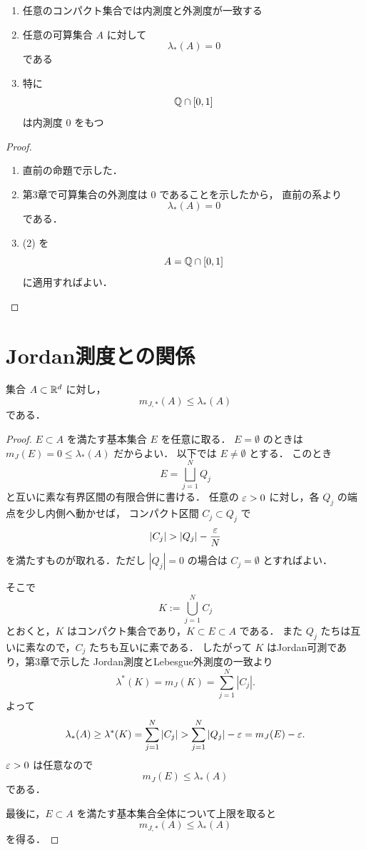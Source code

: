 \begin{example}
\begin{enumerate}
    \item 任意のコンパクト集合では内測度と外測度が一致する
    \item 任意の可算集合 $A$ に対して
    \[
    \lambda_*(A)=0
    \]
    である
    \item 特に
    \[
    \mathbb Q \cap [0,1]
    \]
    は内測度 $0$ をもつ
\end{enumerate}
\end{example}

\begin{proof}
\begin{enumerate}
    \item 直前の命題で示した．
    \item 第3章で可算集合の外測度は $0$ であることを示したから，
    直前の系より
    \[
    \lambda_*(A)=0
    \]
    である．
    \item (2) を
    \[
    A=\mathbb Q \cap [0,1]
    \]
    に適用すればよい．
\end{enumerate}
\end{proof}

\section{Jordan測度との関係}
\begin{theorem} \label{thm:jordan-inner-lebesgue-inner}
集合 $A \subset \mathbb R^d$ に対し，\[
m_{J,*}(A) \le \lambda_*(A)
\]
である．
\end{theorem}

\begin{proof}
$E\subset A$ を満たす基本集合 $E$ を任意に取る．
$E=\emptyset$ のときは $m_J(E)=0\le\lambda_*(A)$ だからよい．
以下では $E\neq\emptyset$ とする．
このとき
\[
E=\bigsqcup_{j=1}^{N}Q_j
\]
と互いに素な有界区間の有限合併に書ける．
任意の $\varepsilon>0$ に対し，各 $Q_j$ の端点を少し内側へ動かせば，
コンパクト区間 $C_j\subset Q_j$ で
\[
|C_j|>|Q_j|-\frac{\eps}{N}
\]
を満たすものが取れる．ただし $|Q_j|=0$ の場合は $C_j=\emptyset$ とすればよい．

そこで
\[
K:=\bigcup_{j=1}^{N}C_j
\]
とおくと，$K$ はコンパクト集合であり，$K\subset E\subset A$ である．
また $Q_j$ たちは互いに素なので，$C_j$ たちも互いに素である．
したがって $K$ はJordan可測であり，第3章で示した
Jordan測度とLebesgue外測度の一致より
\[
\lambda^*(K)=m_J(K)=\sum_{j=1}^{N}|C_j|.
\]
よって
\[
\lambda_*(A)
\ge \lambda^*(K)
=\sum_{j=1}^{N}|C_j|
>
\sum_{j=1}^{N}|Q_j|-\varepsilon
=m_J(E)-\varepsilon.
\]
$\varepsilon>0$ は任意なので
\[
m_J(E)\le \lambda_*(A)
\]
である．

最後に，$E\subset A$ を満たす基本集合全体について上限を取ると
\[
m_{J,*}(A)\le \lambda_*(A)
\]
を得る．
\end{proof}

